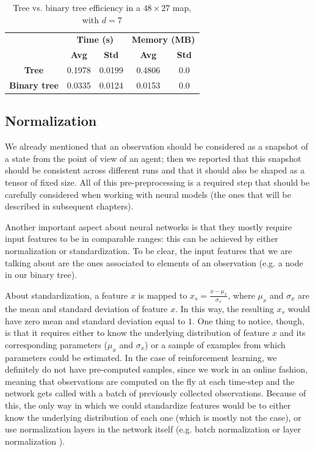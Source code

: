 \documentclass[a4paper,10pt]{report}
\begin{document}
\begin{table}[h]
	\center
	\begin{tabular}{||c c c c c||}
		\hline
					& \multicolumn{2}{c}{\textbf{Time (s)}} & \multicolumn{2}{c||}{\textbf{Memory (MB)}} \\  [0.5ex]
					& \textbf{Avg}         & \textbf{Std}        & \textbf{Avg}          & \textbf{Std} \\  [0.5ex]
		\hline\hline
		\textbf{Tree} & 0.1978 & 0.0199 & 0.4806 & 0.0 \\
		\hline
		\textbf{Binary tree} & 0.0335 & 0.0124 & 0.0153 & 0.0 \\
		\hline       
	\end{tabular}
	\caption{Tree vs. binary tree efficiency in a $48\times 27$ map, with $d=7$}
	\label{table:tree-bt-48x27}
\end{table}

\subsection{Normalization}
We already mentioned that an observation should be considered as a snapshot of a state from the point of view of an agent; then we reported that this snapshot should be consistent across different runs and that it should also be shaped as a tensor of fixed size. All of this pre-preprocessing is a required step that should be carefully considered when working with neural models (the ones that will be described in subsequent chapters). 

Another important aspect about neural networks is that they mostly require input features to be in comparable ranges: this can be achieved by either normalization or standardization. To be clear, the input features that we are talking about are the ones associated to elements of an observation (e.g. a node in our binary tree).

About standardization, a feature $x$ is mapped to $x_s=\frac{x-\mu_x}{\sigma_x}$, where $\mu_x$ and $\sigma_x$ are the mean and standard deviation of feature $x$. In this way, the resulting $x_s$ would have zero mean and standard deviation equal to $1$. One thing to notice, though, is that it requires either to know the underlying distribution of feature $x$ and its corresponding parameters ($\mu_x$ and $\sigma_x$) or a sample of examples from which parameters could be estimated. In the case of reinforcement learning, we definitely do not have pre-computed samples, since we work in an online fashion, meaning that observations are computed on the fly at each time-step and the network gets called with a batch of previously collected observations. Because of this, the only way in which we could standardize features would be to either know the underlying distribution of each one (which is mostly not the case), or use normalization layers in the network itself (e.g. batch normalization \cite{batch-norm} or layer normalization \cite{layer-norm}).
\end{document}
